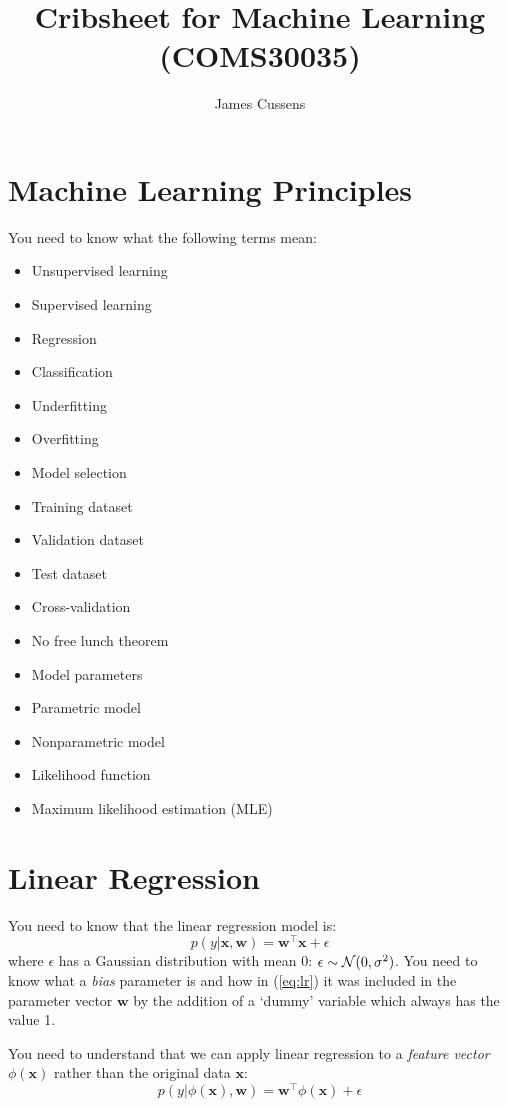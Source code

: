 \documentclass{article}
\title{Cribsheet for Machine Learning (COMS30035)}
\author{James Cussens}
\newcommand{\yntk}{You need to know}
\begin{document}
\maketitle

\section{Machine Learning Principles}
\label{sec:ml}

\yntk{} what the following terms mean:

\begin{itemize}
\item Unsupervised learning
\item Supervised learning
\item Regression
\item Classification
\item Underfitting
\item Overfitting
\item Model selection
\item Training dataset
\item Validation dataset
\item Test dataset
\item Cross-validation
\item No free lunch theorem
\item Model parameters
\item Parametric model
\item Nonparametric model
\item Likelihood function
\item Maximum likelihood estimation (MLE)
\end{itemize}

\section{Linear Regression}

\yntk{} that the linear regression model is:
\begin{equation}
  \label{eq:lr}
  p(y|\mathbf{x},\mathbf{w}) = \mathbf{w}^{\top}\mathbf{x} + \epsilon 
\end{equation}
where $\epsilon$ has a Gaussian distribution with mean 0:
$\epsilon \sim {\cal N}(0,\sigma^{2})$. You need to know what a
\emph{bias} parameter is and how in (\ref{eq:lr}) it was included in
the parameter vector $\mathbf{w}$ by the addition of a `dummy'
variable which always has the value 1.

You need to understand that we can apply linear regression to a
\emph{feature vector} $\phi(\mathbf{x})$ rather than the original data
$\mathbf{x}$:
\begin{equation}
  \label{eq:lrfeats}
  p(y|\phi(\mathbf{x}),\mathbf{w}) = \mathbf{w}^{\top}\phi(\mathbf{x}) + \epsilon\end{equation}
\end{document}
